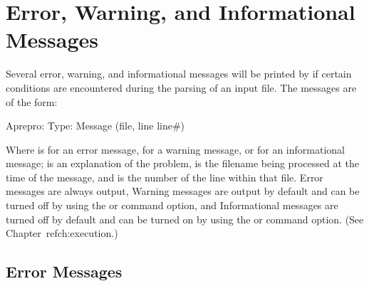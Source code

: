 \chapter{Error, Warning, and Informational Messages}\label{ch:errors}

Several error, warning, and informational messages will be printed by
\aprepro{} if certain conditions are encountered during the parsing of an
input file. The messages are of the form:

\begin{apinp}
Aprepro:  Type:  Message  (file,  line  line\#)
\end{apinp}

Where  is  for an error message,  for a
warning message, or  for an informational message; 
is an explanation of the problem,  is the filename being processed
at the time of the message, and  is the number of the line
within that file. Error messages are always output, Warning messages
are output by default and can be turned off by using the  or
 command option, and Informational messages are turned off by
default and can be turned on by using the  or  command
option. (See Chapter~ref{ch:execution}.)

\section{Error Messages}

